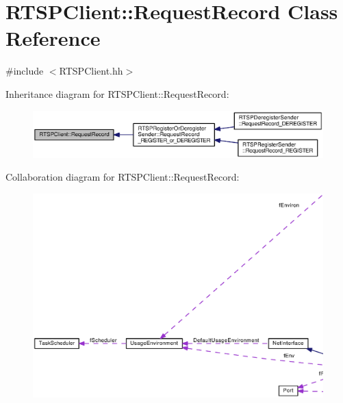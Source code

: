 \section{R\+T\+S\+P\+Client\+:\+:Request\+Record Class Reference}
\label{classRTSPClient_1_1RequestRecord}


{\ttfamily \#include $<$R\+T\+S\+P\+Client.\+hh$>$}



Inheritance diagram for R\+T\+S\+P\+Client\+:\+:Request\+Record\+:
\nopagebreak
\begin{figure}[H]
\begin{center}
\leavevmode
\includegraphics[width=350pt]{classRTSPClient_1_1RequestRecord__inherit__graph}
\end{center}
\end{figure}


Collaboration diagram for R\+T\+S\+P\+Client\+:\+:Request\+Record\+:
\nopagebreak
\begin{figure}[H]
\begin{center}
\leavevmode
\includegraphics[width=350pt]{classRTSPClient_1_1RequestRecord__coll__graph}
\end{center}
\end{figure}

